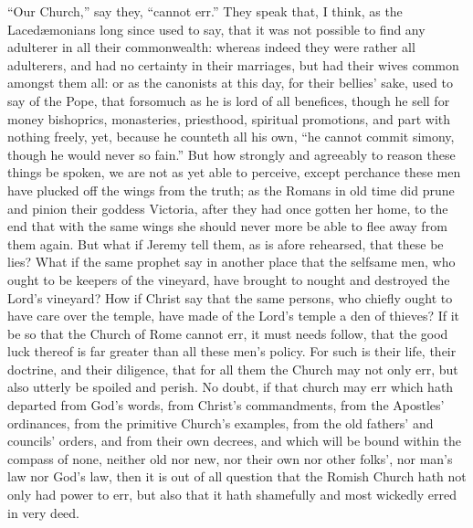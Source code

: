 “Our Church,” say they, “cannot err.”
They speak that, I think, as the Lacedæmonians long since used
to say, that it was not possible to find any adulterer in all their
commonwealth: whereas indeed
they were rather all adulterers, and had no certainty in their marriages,
but had their wives common amongst them all: or as the canonists at
this day, for their bellies’ sake, used to say of the Pope, that
forsomuch as he is lord of all benefices, though he sell for money bishoprics,
monasteries, priesthood, spiritual promotions, and part with nothing
freely, yet, because he counteth all his own, “he cannot commit
simony, though he would never so fain.” But how strongly
and agreeably to reason these things be spoken, we are not as yet able
to perceive, except perchance these men have plucked off the wings from
the truth; as the Romans in old time did prune and pinion their goddess
Victoria, after they had once gotten her home, to the end that with
the same wings she should never more be able to flee away from them
again. But what if Jeremy tell them, as is afore rehearsed, that
these be lies? What if the same prophet say in another place that
the selfsame men, who ought to be keepers of the vineyard, have brought
to nought and destroyed the Lord’s vineyard? How if Christ
say that the same persons, who chiefly ought to have care over the temple,
have made of the Lord’s temple a den of thieves? If it be
so that the Church of Rome cannot
err, it must needs follow, that the good luck thereof is far greater
than all these men’s policy. For such is their life, their
doctrine, and their diligence, that for all them the Church may not
only err, but also utterly be spoiled and perish. No doubt, if
that church may err which hath departed from God’s words, from
Christ’s commandments, from the Apostles’ ordinances, from
the primitive Church’s examples, from the old fathers’ and
councils’ orders, and from their own decrees, and which will be
bound within the compass of none, neither old nor new, nor their own
nor other folks’, nor man’s law nor God’s law, then
it is out of all question that the Romish Church hath not only had power
to err, but also that it hath shamefully and most wickedly erred in
very deed.

